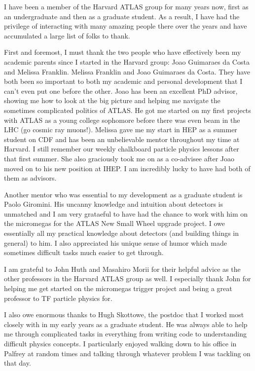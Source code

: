 
I have been a member of the Harvard ATLAS group for many years now, first as an undergraduate and then as a graduate student. As a result, I have had the privilege of interacting with many amazing people there over the years and have accumulated a large list of folks to thank. 

First and foremost, I must thank the two people who have effectively been my academic parents since I started in the Harvard group: Joao Guimaraes da Costa and Melissa Franklin. Melissa Franklin and Joao Guimaraes da Costa. They have both been so important to both my academic and personal development that I can't even put one before the other. Joao has been an excellent PhD advisor, showing me how to look at the big picture and helping me navigate the sometimes complicated politics of ATLAS. He got me started on my first projects with ATLAS as a young college sophomore before there was even beam in the LHC (go cosmic ray muons!). Melissa gave me my start in HEP as a summer student on CDF and has been an unbelievable mentor throughout my time at Harvard. I still remember our weekly chalkboard particle physics lessons after that first summer. She also graciously took me on as a co-advisee after Joao moved on to his new position at IHEP. I am incredibly lucky to have had both of them as advisors. 

Another mentor who was essential to my development as a graduate student is Paolo Giromini. His uncanny knowledge and intuition about detectors is unmatched and I am very grataeful to have had the chance to work with him on the micromegas for the ATLAS New Small Wheel upgrade project. I owe essentially all my practical knowledge about detectors (and building things in general) to him. I also appreciated his unique sense of humor which made sometimes difficult tasks much easier to get through.

I am grateful to John Huth and Masahiro Morii for their helpful advice as the other professors in the Harvard ATLAS group as well. I especially thank John for helping me get started on the micromegas trigger project and being a great professor to TF particle physics for. 

I also owe enormous thanks to Hugh Skottowe, the postdoc that I worked most closely with in my early years as a graduate student. He was always able to help me through complicated tasks in everything from writing code to understanding difficult physics concepts. I particularly enjoyed walking down to his office in Palfrey at random times and talking through whatever problem I was tackling on that day. 

